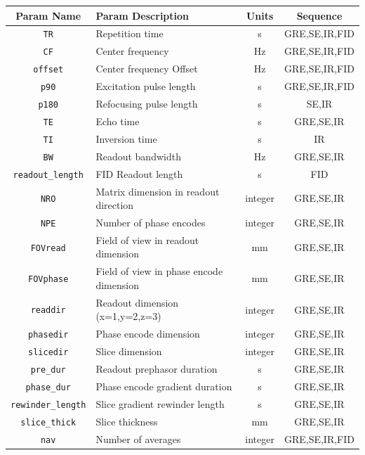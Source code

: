 \documentclass[review]{elsarticle}
\begin{document}
\begin{table}
\begin{tabularx}{\textwidth}{|c|X|c|c|}
	\hline
	\textbf{Param Name} & \textbf{Param Description} & \textbf{Units} & \textbf{Sequence}  \\ \hline
	\texttt{TR} & Repetition time & s &GRE,SE,IR,FID\\ \hline
	\texttt{CF} & Center frequency & Hz &GRE,SE,IR,FID\\ \hline
	\texttt{offset} & Center frequency Offset & Hz & GRE,SE,IR,FID\\ \hline
	\texttt{p90} & Excitation pulse length & s & GRE,SE,IR,FID\\ \hline
	\texttt{p180} & Refocusing pulse length & s & SE,IR\\ \hline
	\texttt{TE} & Echo time & s & GRE,SE,IR\\ \hline
	\texttt{TI} & Inversion time & s & IR\\ \hline
	\texttt{BW} & Readout bandwidth & Hz & GRE,SE,IR\\ \hline
	\texttt{readout\_length} & FID Readout length & s & FID \\ \hline
	\texttt{NRO} & Matrix dimension in readout direction & integer & GRE,SE,IR\\ \hline
	\texttt{NPE} & Number of phase encodes & integer & GRE,SE,IR\\ \hline
	\texttt{FOVread} & Field of view in readout dimension & mm & GRE,SE,IR\\ \hline
	\texttt{FOVphase} & Field of view in phase encode dimension & mm & GRE,SE,IR\\ \hline
	\texttt{readdir} & Readout dimension (x=1,y=2,z=3) & integer & GRE,SE,IR\\ \hline
	\texttt{phasedir} & Phase encode dimension & integer & GRE,SE,IR\\ \hline
	\texttt{slicedir} & Slice dimension & integer & GRE,SE,IR\\ \hline
	\texttt{pre\_dur} & Readout prephasor duration & s & GRE,SE,IR\\ \hline
	\texttt{phase\_dur} & Phase encode gradient duration & s & GRE,SE,IR\\ \hline
	\texttt{rewinder\_length} & Slice gradient rewinder length & s & GRE,SE,IR\\ \hline
	\texttt{slice\_thick} & Slice thickness & mm & GRE,SE,IR\\ \hline
	\texttt{nav} & Number of averages & integer & GRE,SE,IR,FID\\ \hline

\end{tabularx}
\end{table}
\end{document}
